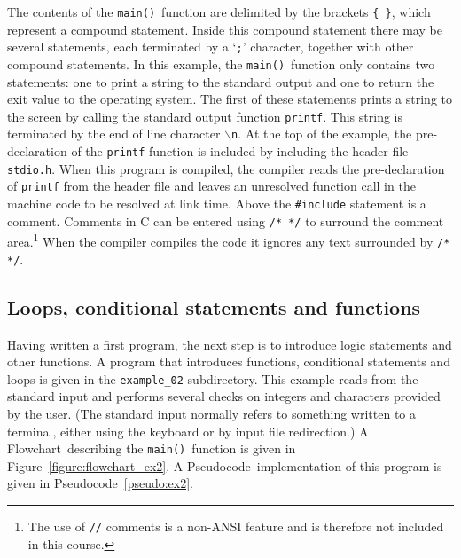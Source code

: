 \documentclass[11pt]{scrartcl}
\def\main{\texttt{main()}}
\def\psc{Pseudocode}
\def\flo{Flowchart}
\begin{document}
The contents of the \main\ function are delimited by the brackets
\texttt{\{ \}}, which represent a compound statement.  Inside this
compound statement there may be several statements, each terminated by a
`\texttt{;}' character, together with other compound statements.  In this example, the \main\ function only contains two statements: one to print a string to the standard output and one to return the exit value to the operating system.  The first of these statements prints a string to the screen by calling the standard output function \texttt{printf}.  This string is terminated by the end of line character \texttt{$\backslash$n}.  At the top of the example, the pre-declaration of the \texttt{printf} function is included by including the header file \texttt{stdio.h}.  When this program is compiled, the compiler reads the pre-declaration of \texttt{printf} from the header file and leaves an unresolved function call in the machine code to be resolved at link time.  Above the \texttt{\#include} statement is a comment.  Comments in C can be entered using \texttt{/* */} to surround the comment area.\footnote{The use of
\texttt{//} comments is a non-ANSI feature and is therefore not
included in this course.}  When the compiler compiles the code it
ignores any text surrounded by \texttt{/* */}.

\clearpage
\newpage

\subsection{Loops, conditional statements and functions}
Having written a first program, the next step is to introduce logic statements and other functions.  A program that introduces functions, conditional statements and loops is given in the \texttt{example_02} subdirectory.  This example reads from the standard input and performs several checks on integers and characters provided by the user.  (The standard
input normally refers to something written to a terminal, either using the keyboard
or by input file redirection.)  A \flo\ describing the \main\ function is
given in Figure~\ref{figure:flowchart_ex2}.  A \psc\
implementation of this program is given in \psc~\ref{pseudo:ex2}.
\end{document}
